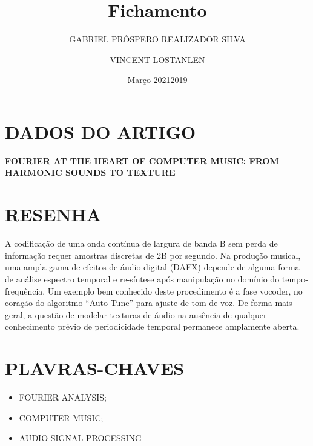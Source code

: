 \documentclass{article}
\title{Fichamento}
\author{GABRIEL PRÓSPERO REALIZADOR  SILVA}
\date{Março 2021}
\begin{document}
\maketitle

\section{DADOS DO ARTIGO}
\textbf{FOURIER AT THE HEART OF COMPUTER MUSIC: FROM HARMONIC SOUNDS TO TEXTURE \\}
\author{VINCENT LOSTANLEN \\}
\date{2019}

\section{RESENHA}
A codificação de uma onda contínua de largura de banda B sem perda de informação requer amostras discretas de 2B por segundo. Na produção musical, uma ampla gama de efeitos de áudio digital (DAFX) depende de alguma forma de análise espectro temporal e re-síntese após manipulação no domínio do tempo-frequência. Um exemplo bem conhecido deste procedimento é a fase vocoder, no coração do algoritmo “Auto Tune” para ajuste de tom de voz. De forma mais geral, a questão de modelar texturas de áudio na ausência de qualquer conhecimento prévio de periodicidade temporal permanece amplamente aberta.

\section{PLAVRAS-CHAVES}
\begin{itemize}
    \item FOURIER ANALYSIS; 
    \item COMPUTER MUSIC; 
    \item AUDIO SIGNAL PROCESSING
\end{itemize}
\end{document}

